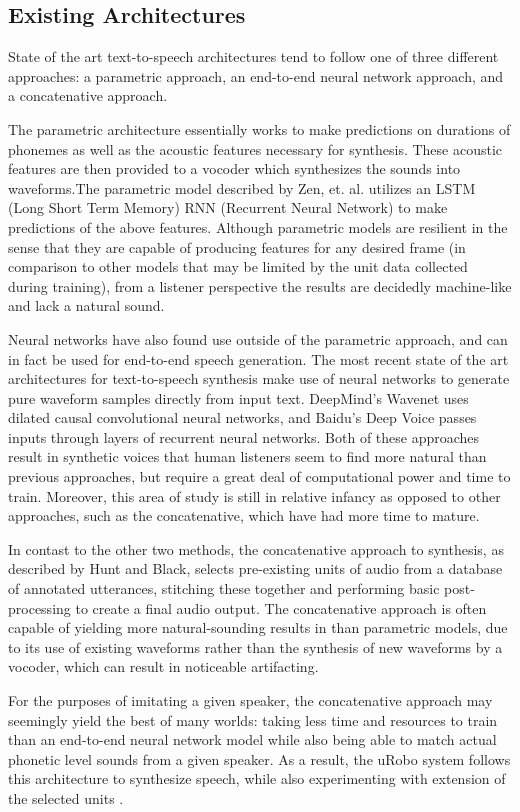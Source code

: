 \documentclass[10pt, journal, compsoc]{IEEEtran}
\begin{document}
\subsection{Existing Architectures}
State of the art text-to-speech architectures tend to follow one of three different approaches: a parametric approach, an end-to-end neural network approach, and a concatenative approach.\par
The parametric architecture essentially works to make predictions on durations of phonemes as well as the acoustic features necessary for synthesis. These acoustic features are then provided to a vocoder which synthesizes the sounds into waveforms.The parametric model described by Zen, et. al. utilizes an LSTM (Long Short Term Memory) RNN (Recurrent Neural Network) to make predictions of the above features.\cite{DBLP:journals/corr/ZenAEHS16} Although parametric models are resilient in the sense that they are capable of producing features for any desired frame (in comparison to other models that may be limited by the unit data collected during training), from a listener perspective the results are decidedly machine-like and lack a natural sound.\par
Neural networks have also found use outside of the parametric approach, and can in fact be used for end-to-end speech generation. The most recent state of the art architectures for text-to-speech synthesis make use of neural networks to generate pure waveform samples directly from input text. DeepMind's Wavenet uses dilated causal convolutional neural networks\cite{DBLP:journals/corr/ArikCCDGKLMRSS17}, and Baidu's Deep Voice passes inputs through layers of recurrent neural networks. Both of these approaches result in synthetic voices that human listeners seem to find more natural than previous approaches\cite{DBLP:journals/corr/OordDZSVGKSK16}, but require a great deal of computational power and time to train. Moreover, this area of study is still in relative infancy as opposed to other approaches, such as the concatenative, which have had more time to mature.\par
In contast to the other two methods, the concatenative approach to synthesis, as described by Hunt and Black, selects pre-existing units of audio from a database of annotated utterances, stitching these together and performing basic post-processing to create a final audio output\cite{Hunt:1996:USC:1256383.1256532}. The concatenative approach is often capable of yielding more natural-sounding results in than parametric models, due to its use of existing waveforms rather than the synthesis of new waveforms by a vocoder, which can result in noticeable  artifacting.\par
For the purposes of imitating a given speaker, the concatenative approach may seemingly yield the best of many worlds: taking less time and resources to train than an end-to-end neural network model while also being able to match actual phonetic level sounds from a given speaker. As a result, the uRobo system follows this architecture to synthesize speech, while also experimenting with extension of the selected units .  
\end{document}
